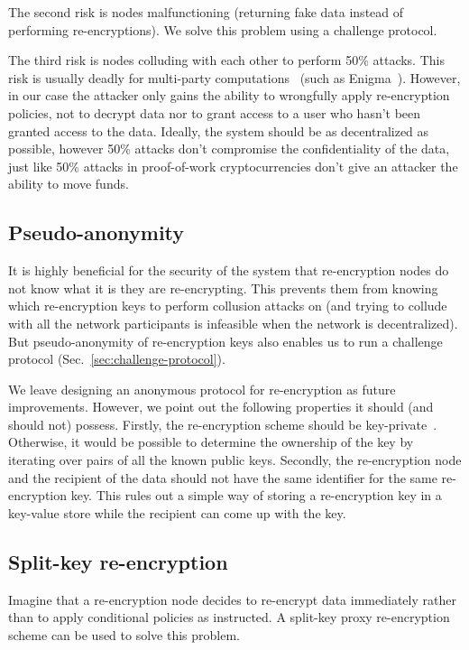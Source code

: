 \documentclass[longbibliography,nofootinbib]{revtex4-1}
\begin{document}
The second risk is nodes malfunctioning (returning fake data instead of performing re-encryptions).
We solve this problem using a challenge protocol.

The third risk is nodes colluding with each other to perform 50\% attacks.
This risk is usually deadly for multi-party computations~\cite{vitalik-secret-dao} (such as Enigma~\cite{enigma}). However, in our case the attacker only gains the ability to wrongfully apply re-encryption policies, not to decrypt data nor to grant access to a user who hasn't been granted access to the data.
Ideally, the system should be as decentralized as possible, however 50\% attacks don't compromise the confidentiality of the data, just like 50\% attacks in
proof-of-work cryptocurrencies don't give an attacker the ability to move funds.

\subsection{Pseudo-anonymity}
\label{sec:anonymity}

It is highly beneficial for the security of the system that re-encryption nodes do not know what it is they are re-encrypting.
This prevents them from knowing which re-encryption keys to perform collusion attacks on (and trying to collude with all the network participants
is infeasible when the network is decentralized).
But pseudo-anonymity of re-encryption keys also enables us to run a challenge protocol (Sec.~\ref{sec:challenge-protocol}).

We leave designing an anonymous protocol for re-encryption as future improvements.
However, we point out the following properties it should (and should not) possess.
Firstly, the re-encryption scheme should be key-private~\cite{Ateniese-key-private,lwe-reencryption}.
Otherwise, it would be possible to determine the ownership of the key by iterating over pairs of all the known public keys.
Secondly, the re-encryption node and the recipient of the data should not have the same identifier for the same re-encryption key.
This rules out a simple way of storing a re-encryption key in a key-value store while the recipient can come up with the key.

\subsection{Split-key re-encryption}
\label{sec:split-key}

Imagine that a re-encryption node decides to re-encrypt data immediately rather than to apply conditional policies as instructed.
A split-key proxy re-encryption scheme can be used to solve this problem.
\end{document}
